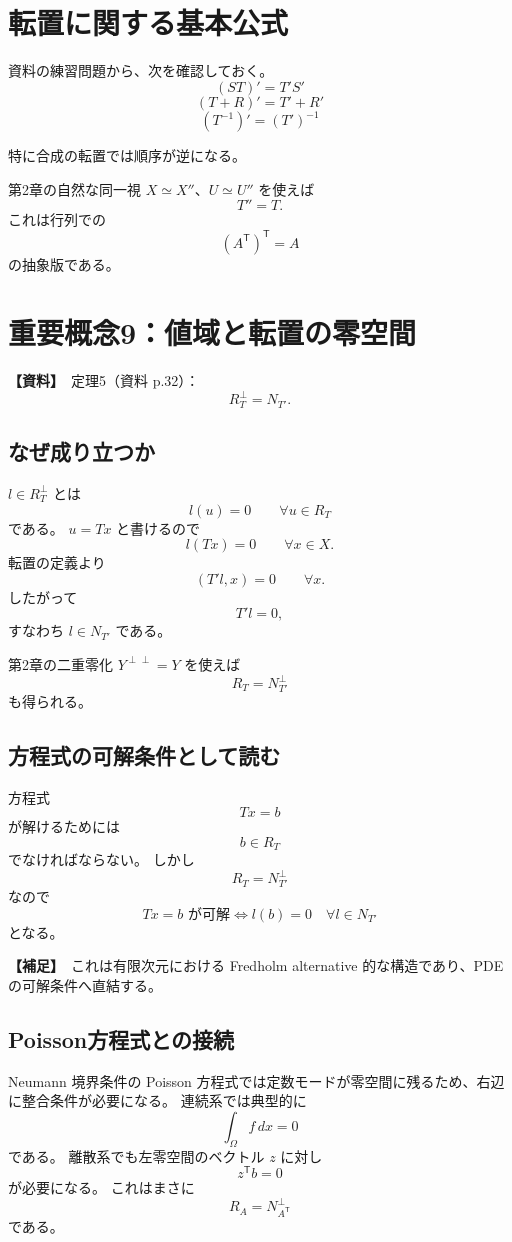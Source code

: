 \documentclass[a4paper,11pt]{ltjsarticle}
\newcommand{\sourceitem}{\textbf{【資料】}}
\newcommand{\suppitem}{\textbf{【補足】}}
\begin{document}
\section{転置に関する基本公式}

資料の練習問題から、次を確認しておく。
\[
\boxed{(ST)'=T'S'}
\]
\[
\boxed{(T+R)'=T'+R'}
\]
\[
\boxed{(T^{-1})'=(T')^{-1}}
\]

特に合成の転置では順序が逆になる。

第2章の自然な同一視 $X\simeq X''$、$U\simeq U''$ を使えば
\[
\boxed{T''=T.}
\]
これは行列での
\[
(A^{\mathsf T})^{\mathsf T}=A
\]
の抽象版である。

\section{重要概念9：値域と転置の零空間}

\sourceitem\ 定理5（資料 p.32）：
\[
\boxed{R_T^\perp=N_{T'}.}
\]

\subsection{なぜ成り立つか}
$l\in R_T^\perp$ とは
\[
l(u)=0\qquad \forall u\in R_T
\]
である。
$u=Tx$ と書けるので
\[
l(Tx)=0\qquad \forall x\in X.
\]
転置の定義より
\[
(T'l,x)=0\qquad \forall x.
\]
したがって
\[
T'l=0,
\]
すなわち $l\in N_{T'}$ である。

第2章の二重零化 $Y^{\perp\perp}=Y$ を使えば
\[
\boxed{R_T=N_{T'}^\perp}
\]
も得られる。

\subsection{方程式の可解条件として読む}
方程式
\[
Tx=b
\]
が解けるためには
\[
b\in R_T
\]
でなければならない。
しかし
\[
R_T=N_{T'}^\perp
\]
なので
\[
\boxed{
Tx=b\text{ が可解}
\iff
l(b)=0\quad \forall l\in N_{T'}
}
\]
となる。

\suppitem\ これは有限次元における Fredholm alternative 的な構造であり、PDE の可解条件へ直結する。

\subsection{Poisson方程式との接続}
Neumann 境界条件の Poisson 方程式では定数モードが零空間に残るため、右辺に整合条件が必要になる。
連続系では典型的に
\[
\int_\Omega f\,dx=0
\]
である。
離散系でも左零空間のベクトル $z$ に対し
\[
z^{\mathsf T}b=0
\]
が必要になる。
これはまさに
\[
R_A=N_{A^{\mathsf T}}^\perp
\]
である。
\end{document}

